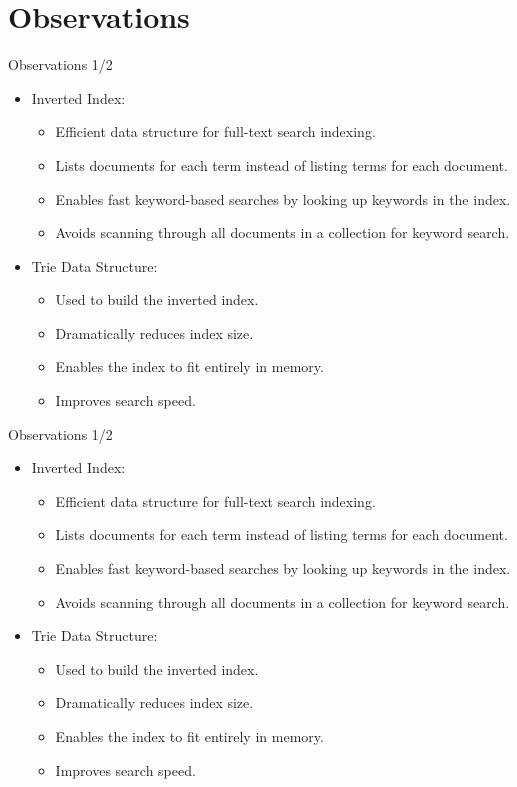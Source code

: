 \documentclass{beamer}
\begin{document}
\section{Observations}

\begin{frame}{Observations 1/2}
    \begin{itemize}
        \item Inverted Index:
        \begin{itemize}
        \item Efficient data structure for full-text search indexing.
        \item Lists documents for each term instead of listing terms for each document.
        \item Enables fast keyword-based searches by looking up keywords in the index.
        \item Avoids scanning through all documents in a collection for keyword search.
        \end{itemize}
        \item Trie Data Structure:
        \begin{itemize}
        \item Used to build the inverted index.
        \item Dramatically reduces index size.
        \item Enables the index to fit entirely in memory.
        \item Improves search speed.
        \end{itemize}
        \end{itemize}
\end{frame}

\begin{frame}{Observations 1/2}
    \begin{itemize}
        \item Inverted Index:
        \begin{itemize}
        \item Efficient data structure for full-text search indexing.
        \item Lists documents for each term instead of listing terms for each document.
        \item Enables fast keyword-based searches by looking up keywords in the index.
        \item Avoids scanning through all documents in a collection for keyword search.
        \end{itemize}
        \item Trie Data Structure:
        \begin{itemize}
        \item Used to build the inverted index.
        \item Dramatically reduces index size.
        \item Enables the index to fit entirely in memory.
        \item Improves search speed.
        \end{itemize}
        \end{itemize}
\end{frame}
\end{document}
